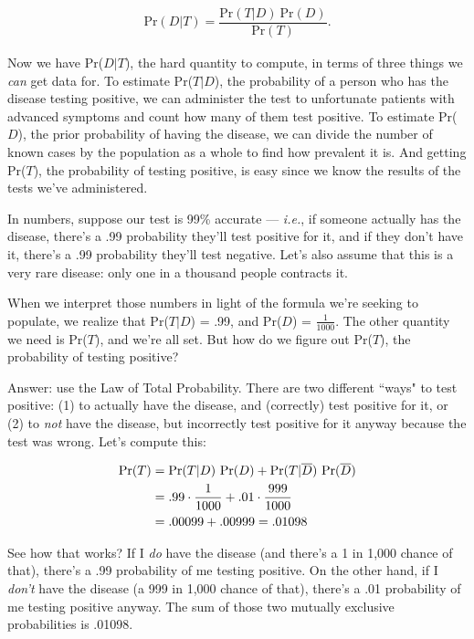 \begin{align*}
\text{Pr}(D|T) = \dfrac{\text{Pr}(T|D) \ \text{Pr}(D)}{\text{Pr}(T)}.
\end{align*}

Now we have Pr($D|T$), the hard quantity to compute, in terms of three
things we \textit{can} get data for. To estimate Pr($T|D$), the probability
of a person who has the disease testing positive, we can administer the
test to unfortunate patients with advanced symptoms and count how many of
them test positive. To estimate Pr($D$), the prior probability of having
the disease, we can divide the number of known cases by the population as a
whole to find how prevalent it is. And getting Pr($T$), the probability of
testing positive, is easy since we know the results of the tests we've
administered.

In numbers, suppose our test is 99\% accurate --- \textit{i.e.}, if someone
actually has the disease, there's a .99 probability they'll test positive
for it, and if they don't have it, there's a .99 probability they'll test
negative. Let's also assume that this is a very rare disease: only one in a
thousand people contracts it.

When we interpret those numbers in light of the formula we're seeking to
populate, we realize that Pr($T|D$) = .99, and Pr($D$) = $\frac{1}{1000}$.
The other quantity we need is Pr($T$), and we're all set. But how do we
figure out Pr($T$), the probability of testing positive?

Answer: use the Law of Total Probability. There are two different ``ways" to
test positive: (1) to actually have the disease, and (correctly) test
positive for it, or (2) to \textit{not} have the disease, but incorrectly
test positive for it anyway because the test was wrong. Let's compute this:

\begin{align}
\text{Pr}(T) &=
    \text{Pr}(T|D) \ \text{Pr}(D) + 
    \text{Pr}(T|\overline{D}) \ \text{Pr}({\overline{D}}) \notag \\
&= .99 \cdot \frac{1}{1000} + .01 \cdot \frac{999}{1000} \notag \\
&= .00099 + .00999 = .01098  \label{totalprobeq}
\end{align}

See how that works? If I \textit{do} have the disease (and there's a 1 in
1,000 chance of that), there's a .99 probability of me testing positive. On
the other hand, if I \textit{don't} have the disease (a 999 in 1,000 chance
of that), there's a .01 probability of me testing positive anyway. The sum
of those two mutually exclusive probabilities is .01098.

